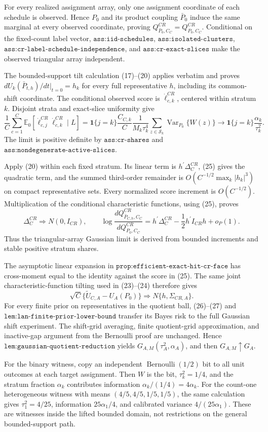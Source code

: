 For every realized assignment array, only one assignment coordinate of each schedule is observed.  Hence \(P_0\) and its product coupling \(\bar P_0\) induce the same marginal at every observed coordinate, proving \(Q^{CR}_{\bar P_0,C_C}=Q^{CR}_{P_0,C_C}\).  Conditional on the fixed-count label vector, \(\texttt{ass:iid-schedules}\), \(\texttt{ass:isolated-clusters}\), \(\texttt{ass:cr-label-schedule-independence}\), and \(\texttt{ass:cr-exact-slices}\) make the observed triangular array independent.

The bounded-support tilt calculation (17)--(20) applies verbatim and proves \(dU_k(\bar P_{t,h})/dt|_{t=0}=h_k\) for every full representative \(h\), including its common-shift coordinate.  The conditional observed score is \(\dot\ell_{c,k}^{CR}\), centered within stratum \(k\).  Disjoint strata and exact-slice uniformity give
\[
\frac1C\sum_{c=1}^C
\mathbb E_0[\dot\ell_{c,j}^{CR}\dot\ell_{c,k}^{CR}\mid L]
=\mathbf1\{j=k\}\frac{C_{C,k}}C
 \frac1{M_k\tau_k^4}\sum_{z\in\mathcal S_k}
 \operatorname{Var}_{P_0}\{W(z)\}
\longrightarrow\mathbf1\{j=k\}\frac{\alpha_k}{\tau_k^2}. \tag{25}
\]
The limit is positive definite by \(\texttt{ass:cr-shares}\) and \(\texttt{ass:nondegenerate-active-slices}\).

Apply (20) within each fixed stratum.  Its linear term is \(h^{\prime}\Delta_C^{CR}\), (25) gives the quadratic term, and the summed third-order remainder is \(O(C^{-1/2}\max_k|h_k|^3)\) on compact representative sets.  Every normalized score increment is \(O(C^{-1/2})\).  Multiplication of the conditional characteristic functions, using (25), proves
\[
\Delta_C^{CR}\Rightarrow N(0,I_{CR}),\qquad
\log\frac{dQ^{CR}_{\bar P_{C,h},C_C}}{dQ^{CR}_{P_0,C_C}}
=h^{\prime}\Delta_C^{CR}-\frac12h^{\prime}I_{CR}h+o_P(1). \tag{26}
\]
Thus the triangular-array Gaussian limit is derived from bounded increments and stable positive stratum shares.

The asymptotic linear expansion in \(\texttt{prop:efficient-exact-hit-cr-face}\) has cross-moment equal to the identity against the score in (25).  The same joint characteristic-function tilting used in (23)--(24) therefore gives
\[
\sqrt C\{\widetilde U_{C,A}-U_A(P_0)\}
\Rightarrow N\{h,\Sigma_{CR,A}\}. \tag{27}
\]
For every finite prior on representatives in the quotient ball, (26)--(27) and \(\texttt{lem:lan-finite-prior-lower-bound}\) transfer its Bayes risk to the full Gaussian shift experiment.  The shift-grid averaging, finite quotient-grid approximation, and inactive-gap argument from the Bernoulli proof are unchanged.  Hence \(\texttt{lem:gaussian-quotient-reduction}\) yields \(G_{A,M}(\tau_A^2,\alpha_A)\), and then \(G_{A,M}\uparrow G_A\).

For the binary witness, copy an independent \(\operatorname{Bernoulli}(1/2)\) bit to all unit outcomes at each target assignment.  Then \(W\) is the bit, \(\tau_k^2=1/4\), and the stratum fraction \(\alpha_k\) contributes information \(\alpha_k/(1/4)=4\alpha_k\).  For the count-one heterogeneous witness with means \((4/5,4/5,1/5,1/5)\), the same calculation gives \(\tau_1^2=4/25\), information \(25\alpha_1/4\), and calibrated variance \(4/(25\alpha_1)\).  These are witnesses inside the lifted bounded domain, not restrictions on the general bounded-support path.
